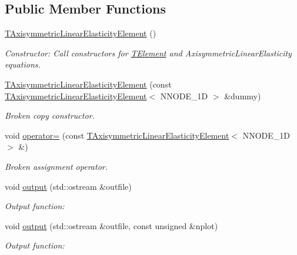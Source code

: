 \subsection*{Public Member Functions}
\begin{DoxyCompactItemize}
\item 
\hyperlink{classoomph_1_1TAxisymmetricLinearElasticityElement_a53d9f1f12cfa81a392b4cadff3be1e48}{T\+Axisymmetric\+Linear\+Elasticity\+Element} ()
\begin{DoxyCompactList}\small\item\em Constructor\+: Call constructors for \hyperlink{classoomph_1_1TElement}{T\+Element} and Axisymmetric\+Linear\+Elasticity equations. \end{DoxyCompactList}\item 
\hyperlink{classoomph_1_1TAxisymmetricLinearElasticityElement_ad7aebefff103ec57124394b34a5bc73a}{T\+Axisymmetric\+Linear\+Elasticity\+Element} (const \hyperlink{classoomph_1_1TAxisymmetricLinearElasticityElement}{T\+Axisymmetric\+Linear\+Elasticity\+Element}$<$ N\+N\+O\+D\+E\+\_\+1D $>$ \&dummy)
\begin{DoxyCompactList}\small\item\em Broken copy constructor. \end{DoxyCompactList}\item 
void \hyperlink{classoomph_1_1TAxisymmetricLinearElasticityElement_a985cc21365c01fe374964f4d063dd5e3}{operator=} (const \hyperlink{classoomph_1_1TAxisymmetricLinearElasticityElement}{T\+Axisymmetric\+Linear\+Elasticity\+Element}$<$ N\+N\+O\+D\+E\+\_\+1D $>$ \&)
\begin{DoxyCompactList}\small\item\em Broken assignment operator. \end{DoxyCompactList}\item 
void \hyperlink{classoomph_1_1TAxisymmetricLinearElasticityElement_a803cb886b6c610f021fdfd41113eeab8}{output} (std\+::ostream \&outfile)
\begin{DoxyCompactList}\small\item\em Output function\+: \end{DoxyCompactList}\item 
void \hyperlink{classoomph_1_1TAxisymmetricLinearElasticityElement_aa56d730cdb3e5e31f4edeb9d270c8218}{output} (std\+::ostream \&outfile, const unsigned \&nplot)
\begin{DoxyCompactList}\small\item\em Output function\+: \end{DoxyCompactList}\item 

\end{DoxyCompactItemize}
